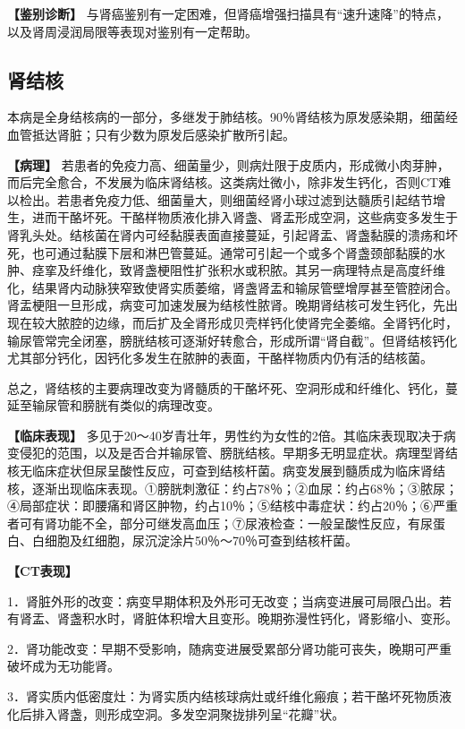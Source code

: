 \textbf{【鉴别诊断】}
与肾癌鉴别有一定困难，但肾癌增强扫描具有“速升速降”的特点，以及肾周浸润局限等表现对鉴别有一定帮助。

\subsection{肾结核}

本病是全身结核病的一部分，多继发于肺结核。90％肾结核为原发感染期，细菌经血管抵达肾脏；只有少数为原发后感染扩散所引起。

\textbf{【病理】}
若患者的免疫力高、细菌量少，则病灶限于皮质内，形成微小肉芽肿，而后完全愈合，不发展为临床肾结核。这类病灶微小，除非发生钙化，否则CT难以检出。若患者免疫力低、细菌量大，则细菌经肾小球过滤到达髓质引起结节增生，进而干酪坏死。干酪样物质液化排入肾盏、肾盂形成空洞，这些病变多发生于肾乳头处。结核菌在肾内可经黏膜表面直接蔓延，引起肾盂、肾盏黏膜的溃疡和坏死，也可通过黏膜下层和淋巴管蔓延。通常可引起一个或多个肾盏颈部黏膜的水肿、痉挛及纤维化，致肾盏梗阻性扩张积水或积脓。其另一病理特点是高度纤维化，结果肾内动脉狭窄致使肾实质萎缩，肾盏肾盂和输尿管壁增厚甚至管腔闭合。肾盂梗阻一旦形成，病变可加速发展为结核性脓肾。晚期肾结核可发生钙化，先出现在较大脓腔的边缘，而后扩及全肾形成贝壳样钙化使肾完全萎缩。全肾钙化时，输尿管常完全闭塞，膀胱结核可逐渐好转愈合，形成所谓“肾自截”。但肾结核钙化尤其部分钙化，因钙化多发生在脓肿的表面，干酪样物质内仍有活的结核菌。

总之，肾结核的主要病理改变为肾髓质的干酪坏死、空洞形成和纤维化、钙化，蔓延至输尿管和膀胱有类似的病理改变。

\textbf{【临床表现】}
多见于20～40岁青壮年，男性约为女性的2倍。其临床表现取决于病变侵犯的范围，以及是否合并输尿管、膀胱结核。早期多无明显症状。病理型肾结核无临床症状但尿呈酸性反应，可查到结核杆菌。病变发展到髓质成为临床肾结核，逐渐出现临床表现。①膀胱刺激征：约占78％；②血尿：约占68％；③脓尿；④局部症状：即腰痛和肾区肿物，约占10％；⑤结核中毒症状：约占20％；⑥严重者可有肾功能不全，部分可继发高血压；⑦尿液检查：一般呈酸性反应，有尿蛋白、白细胞及红细胞，尿沉淀涂片50％～70％可查到结核杆菌。

\textbf{【CT表现】}

1．肾脏外形的改变：病变早期体积及外形可无改变；当病变进展可局限凸出。若有肾盂、肾盏积水时，肾脏体积增大且变形。晚期弥漫性钙化，肾影缩小、变形。

2．肾功能改变：早期不受影响，随病变进展受累部分肾功能可丧失，晚期可严重破坏成为无功能肾。

3．肾实质内低密度灶：为肾实质内结核球病灶或纤维化瘢痕；若干酪坏死物质液化后排入肾盏，则形成空洞。多发空洞聚拢排列呈“花瓣”状。

